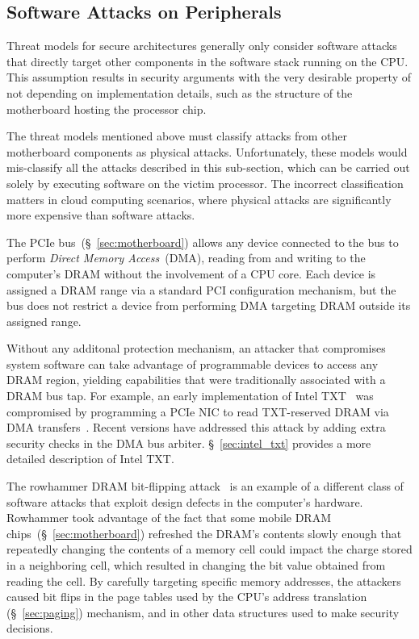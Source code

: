 \subsection{Software Attacks on Peripherals}
\label{sec:device_attacks}

Threat models for secure architectures generally only consider software attacks
that directly target other components in the software stack running on the CPU.
This assumption results in security arguments with the very desirable property
of not depending on implementation details, such as the structure of the
motherboard hosting the processor chip.

The threat models mentioned above must classify attacks from other motherboard
components as physical attacks. Unfortunately, these models would mis-classify
all the attacks described in this sub-section, which can be carried out solely
by executing software on the victim processor. The incorrect classification
matters in cloud computing scenarios, where physical attacks are significantly
more expensive than software attacks.

The PCIe bus~(\S~\ref{sec:motherboard}) allows any device connected to the bus
to perform \textit{Direct Memory Access}~(DMA), reading from and writing to
the computer's DRAM without the involvement of a CPU core. Each device is
assigned a DRAM range via a standard PCI configuration mechanism, but the bus
does not restrict a device from performing DMA targeting DRAM outside its
assigned range.

Without any additonal protection mechanism, an attacker that compromises system
software can take advantage of programmable devices to access any DRAM region,
yielding capabilities that were traditionally associated with a DRAM bus tap.
For example, an early implementation of Intel TXT~\cite{grawrock2009txt} was
compromised by programming a PCIe NIC to read TXT-reserved DRAM via DMA
transfers~\cite{wojtczuk2011txt}. Recent versions have addressed this attack by
adding extra security checks in the DMA bus arbiter. \S~\ref{sec:intel_txt}
provides a more detailed description of Intel TXT.

The rowhammer DRAM bit-flipping attack~\cite{kim2014rowhammer,
google2015rowhammer, gruss2015rowhammer} is an example of a different class of
software attacks that exploit design defects in the computer's hardware.
Rowhammer took advantage of the fact that some mobile DRAM
chips~(\S~\ref{sec:motherboard}) refreshed the DRAM's contents slowly enough
that repeatedly changing the contents of a memory cell could impact the charge
stored in a neighboring cell, which resulted in changing the bit value obtained
from reading the cell. By carefully targeting specific memory addresses, the
attackers caused bit flips in the page tables used by the CPU's address
translation (\S~\ref{sec:paging}) mechanism, and in other data structures used
to make security decisions.

